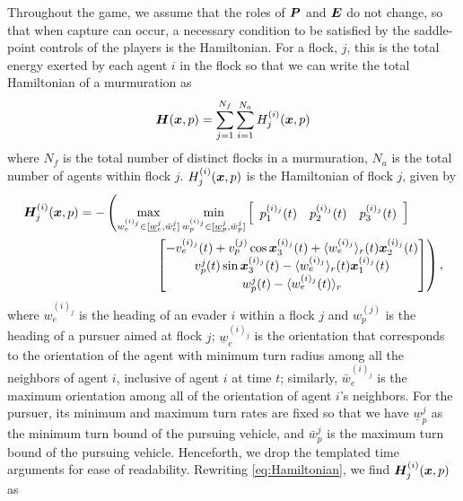 Throughout the game, we assume that the roles of $\bm{P}$  and $\bm{E}$ do not change, so that when capture can occur, a necessary condition to be satisfied by the saddle-point controls of the players is the Hamiltonian. For  a flock, $j$, this is the total energy exerted by each agent $i$ in the flock so that we can write the total Hamiltonian of a murmuration as 
%
\begin{align}
\bm{H}(\bm{x}, p) = \sum_{j=1}^{N_f} \sum_{i=1}^{N_a} H^{(i)}_j(\bm{x}, p)
\label{eq:HamiltonianOverall}
\end{align}
%
where $N_f$ is the total number of distinct flocks in a murmuration, $N_a$ is the total number of agents within flock $j$. $H^{(i)}_j(\bm{x}, p)$ is the Hamiltonian of flock $j$,  given by
%
\begin{align}
\hamfunc^{(i)}_j(\state, p)&= - \left(\max_{w_e^{(i)_j} \in [\underline{w}_e^j, \bar{w}_e^j]}  \min_{w_p^{(i)_j}  \in [\underline{w}_p^{j}, \bar{w}_p^j]}  \left[\begin{array}{ccc} p_1^{(i)_j}(t) & p_2^{(i)_j}(t) & p_3^{(i)_j}(t) \end{array}\right] \right. \nonumber \\ 
%
& \qquad\qquad\qquad \left. 
\begin{bmatrix}
-v_e^{(i)_j}(t) + v_p^{(j)} \cos \state_3^{(i)_j}(t) + \langle w_e^{(i)_j} \rangle_r (t) \state_2^{(i)_j}(t)
\\ 
v_p^{j}(t)\sin \state_3^{(i)_j}(t) -\langle w_e^{(i)_j} \rangle_r (t) \state_1^{(i)_j}(t)
\\ 
w_p^j(t) - \langle w_e^{(i)_j}(t) \rangle_r
\end{bmatrix}\right),
\label{eq:Hamiltonian}
\end{align}
%
where $w_e^{(i)_j}$ is the heading of an evader $i$ within a flock $j$ and $w_p^{(j)}$ is the heading of a pursuer aimed at flock $j$; $\underline{w}_e^{(i)_j}$ is the orientation that corresponds to  the orientation of the agent with minimum turn radius among all the neighbors of agent $i$, inclusive of agent $i$ at time $t$; similarly, $\bar{w}_e^{(i)_j}$ is  the maximum orientation among all of the orientation of agent $i$'s neighbors. For the pursuer, its minimum and maximum turn rates are fixed so that we have $\underline{w}_p^{j}$ as the minimum turn bound of the pursuing vehicle, and $\bar{w}_p^j$ is the maximum turn bound of the pursuing vehicle. Henceforth, we drop the templated time arguments for ease of readability. Rewriting \eqref{eq:Hamiltonian}, we find $\bm{H}^{(i)}_j(\bm{x}, p)$ as
%
